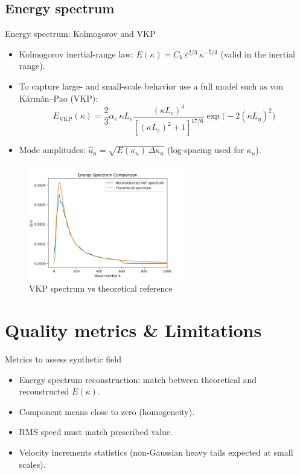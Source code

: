 \documentclass[11pt]{beamer}
\begin{document}
\subsection{Energy spectrum}
\begin{frame}{Energy spectrum: Kolmogorov and VKP}
  \begin{itemize}
    \item Kolmogorov inertial-range law: $E(\kappa)=C_k\,\varepsilon^{2/3}\,\kappa^{-5/3}$ (valid in the inertial range).
    \item To capture large- and small-scale behavior use a full model such as von K\'arm\'an–Pao (VKP):
      \begin{equation}
        E_{\mathrm{VKP}}(\kappa)=\frac{2}{3}\alpha_e\,\kappa L_e\frac{(\kappa L_e)^4}{[(\kappa L_e)^2+1]^{17/6}}\exp\big(-2(\kappa L_\eta)^2\big)
      \end{equation}
    \item Mode amplitudes: $\hat{u}_n=\sqrt{E(\kappa_n)\,\Delta\kappa_n}$ (log-spacing used for $\kappa_n$).
  \end{itemize}
  \begin{figure}
    \centering
    \includegraphics[width=0.6\textwidth]{illustrations/Energy_Spectrum_VKP.png}
    \caption{VKP spectrum vs theoretical reference}
  \end{figure}
\end{frame}

\section{Quality metrics \& Limitations}
\begin{frame}{Metrics to assess synthetic field}
  \begin{itemize}
    \item Energy spectrum reconstruction: match between theoretical and reconstructed $E(\kappa)$.
    \item Component means close to zero (homogeneity).
    \item RMS speed must match prescribed value.
    \item Velocity increments statistics (non-Gaussian heavy tails expected at small scales).
  \end{itemize}
\end{frame}
\end{document}
